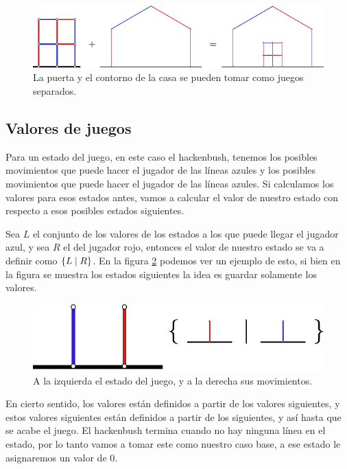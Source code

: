 \begin{figure}[h]
    \centering
    \includegraphics[width=.7\textwidth]{images/hackenbush-sum_example.pdf}
    \caption{La puerta y el contorno de la casa se pueden tomar como juegos separados.}
    \label{figure:hackenbush_sum}
\end{figure}


\subsection{Valores de juegos}

Para un estado del juego, en este caso el hackenbush, tenemos los posibles movimientos que puede hacer el jugador de las l\'ineas azules y los posibles movimientos que puede hacer el jugador de las l\'ineas azules. Si calculamos los valores para esos estados antes, vamos a calcular el valor de nuestro estado con respecto a esos posibles estados siguientes.

Sea $L$ el conjunto de los valores de los estados a los que puede llegar el jugador azul, y sea $R$ el del jugador rojo, entonces el valor de nuestro estado se va a definir como $\left\{L\;\middle|\; R\right\}$. En la figura \ref{figure:hackenbush_val} podemos ver un ejemplo de esto, si bien en la figura se muestra los estados siguientes la idea es guardar solamente los valores.

\begin{figure}[h]
    \centering
    \includegraphics[width=.7\textwidth]{images/hackenbush-val_example.pdf}
    \caption{A la izquierda el estado del juego, y a la derecha sus movimientos.}
    \label{figure:hackenbush_val}
\end{figure}

En cierto sentido, los valores est\'an definidos a partir de los valores siguientes, y estos valores siguientes est\'an definidos a partir de los siguientes, y as\'i hasta que se acabe el juego. El hackenbush termina cuando no hay ninguna l\'inea en el estado, por lo tanto vamos a tomar este como nuestro caso base, a ese estado le asignaremos un valor de $0$. 

